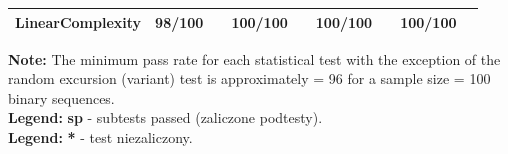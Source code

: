 \begin{table}[h!]
\begin{tabular}{|l|c|l|c|l|c|l|c|l|}
LinearComplexity        &  98/100 &     & 100/100 &     & 100/100 &     & 100/100 &     \\ \hline
\end{tabular}
\begin{flushleft}
\small \textbf{Note:} The minimum pass rate for each statistical test with the exception of the
random excursion (variant) test is approximately = 96 for a
sample size = 100 binary sequences\cite{NIST-SP-800-22}. \\
\small \textbf{Legend:} \textbf{sp} - subtests passed (zaliczone podtesty). \\
\small \textbf{Legend:} \textbf{*} - test niezaliczony.
\end{flushleft}
\end{table}
